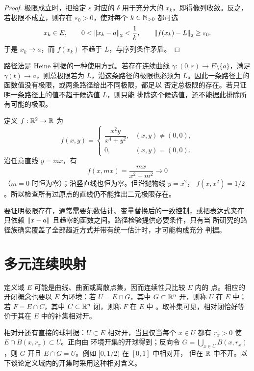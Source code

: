 \begin{proof}
极限成立时，把给定 \(\varepsilon\) 对应的 \(\delta\) 用于充分大的
\(x_k\)，即得像列收敛。反之，若极限不成立，则存在
\(\varepsilon_0>0\)，使对每个 \(k\in\mathbb{N}_{>0}\) 都可选
\[
 x_k\in E,\qquad0<\left\lVert x_k-a\right\rVert_2<\frac1k,\qquad
 \left\lVert f(x_k)-L\right\rVert_2\ge\varepsilon_0.
\]
于是 \(x_k\to a\)，而 \(f(x_k)\) 不趋于 \(L\)，与序列条件矛盾。
\end{proof}

路径法是 Heine 判据的一种使用方式。若存在连续曲线
\(\gamma:(0,r)\to E\setminus\{a\}\)，满足
\(\gamma(t)\to a\)，则总极限若为 \(L\)，沿这条路径的极限也必须为
\(L\)。因此一条路径上的函数值没有极限，或两条路径给出不同极限，都足以
否定总极限的存在。若只证明一条路径上的值不趋于候选值 \(L\)，则只能
排除这个候选值，还不能据此排除所有可能的极限。

\begin{counterexample}[沿每条直线极限相同仍不足]
定义 \(f:\mathbb{R}^2\to\mathbb{R}\) 为
\[
 f(x,y)=
 \begin{cases}
 \dfrac{x^2y}{x^4+y^2},&(x,y)\ne(0,0),\\[0.5em]
 0,&(x,y)=(0,0).
 \end{cases}
\]
沿任意直线 \(y=mx\)，有
\[
 f(x,mx)=\frac{mx}{x^2+m^2}\longrightarrow0
\]
（\(m=0\) 时恒为零）；沿竖直线也恒为零。但沿抛物线 \(y=x^2\)，
\(f(x,x^2)=1/2\)。所以检查所有过原点的直线仍不能推出二元极限存在。
\end{counterexample}

要证明极限存在，通常需要范数估计、变量替换后的一致控制，或把表达式夹在
只依赖 \(\left\lVert x-a\right\rVert\) 且趋零的函数之间。路径检验提供必要条件，只有当
所研究的路径族确实覆盖了全部趋近方式并带有统一估计时，才可能构成充分
判据。

\section{多元连续映射}

定义域 \(E\) 可能是曲线、曲面或离散点集，因而连续性只比较 \(E\) 内的
点。相应的开闭概念也要以 \(E\) 为环境：若 \(U=E\cap G\)，其中
\(G\subset\mathbb{R}^n\) 开，则称 \(U\) 在 \(E\) 中；若
\(F=E\cap C\)，其中 \(C\subset\mathbb{R}^n\) 闭，则称 \(F\) 在 \(E\) 中
。取补集可见，相对闭恰好等价于其在 \(E\) 中的补集相对开。

相对开还有直接的球判据：\(U\subset E\) 相对开，当且仅当每个
\(x\in U\) 都有 \(r_x>0\) 使 \(E\cap B(x,r_x)\subset U\)。正向由
环境开集的开球得到；反向令 \(G=\bigcup_{x\in U}B(x,r_x)\)，则
\(G\) 开且 \(E\cap G=U\)。例如 \([0,1/2)\) 在 \([0,1]\) 中相对开，
但在 \(\mathbb{R}\) 中不开。以下谈论定义域内的开集时采用这种相对含义。

